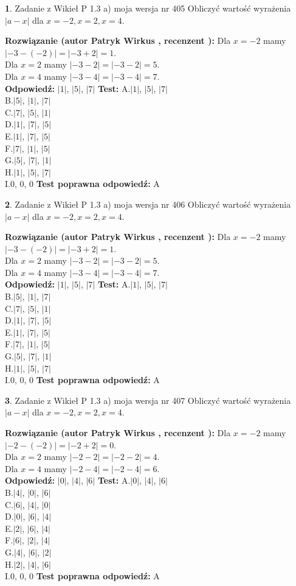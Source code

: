 \documentclass[12pt, a4paper]{article}
\theoremstyle{definition} %
\newtheorem{zad}{}
\newcommand{\zadStart}[1]{\begin{zad}#1\newline}
\newcommand{\zadStop}{\end{zad}}
\newcommand{\rozwStart}[2]{\noindent \textbf{Rozwiązanie (autor #1 , recenzent #2): }\newline}
\newcommand{\rozwStop}{\newline}
\newcommand{\odpStart}{\noindent \textbf{Odpowiedź:}\newline}
\newcommand{\odpStop}{\newline}
\newcommand{\testStart}{\noindent \textbf{Test:}\newline}
\newcommand{\testStop}{\newline}
\newcommand{\kluczStart}{\noindent \textbf{Test poprawna odpowiedź:}\newline}
\newcommand{\kluczStop}{\newline}
\begin{document}
\zadStart{Zadanie z Wikieł P 1.3 a) moja wersja nr 405}
Obliczyć wartość wyrażenia $|a - x|$ dla $x=-2,x=2,x=4$.
\zadStop
\rozwStart{Patryk Wirkus}{}
Dla $x = -2$ mamy $|-3 - (-2)| = |-3 + 2| = 1$.\\
Dla $x = 2$ mamy $|-3 - 2| = |-3 - 2| = 5$.\\
Dla $x = 4$ mamy $|-3 - 4| = |-3 - 4| = 7$.\\
\rozwStop
\odpStart
$|1|$, $|5|$, $|7|$
\odpStop
\testStart
A.$|1|$, $|5|$, $|7|$\\
B.$|5|$, $|1|$, $|7|$\\
C.$|7|$, $|5|$, $|1|$\\
D.$|1|$, $|7|$, $|5|$\\
E.$|1|$, $|7|$, $|5|$\\
F.$|7|$, $|1|$, $|5|$\\
G.$|5|$, $|7|$, $|1|$\\
H.$|1|$, $|5|$, $|7|$\\
I.$0$, $0$, $0$
\testStop
\kluczStart
A
\kluczStop



\zadStart{Zadanie z Wikieł P 1.3 a) moja wersja nr 406}
Obliczyć wartość wyrażenia $|a - x|$ dla $x=-2,x=2,x=4$.
\zadStop
\rozwStart{Patryk Wirkus}{}
Dla $x = -2$ mamy $|-3 - (-2)| = |-3 + 2| = 1$.\\
Dla $x = 2$ mamy $|-3 - 2| = |-3 - 2| = 5$.\\
Dla $x = 4$ mamy $|-3 - 4| = |-3 - 4| = 7$.\\
\rozwStop
\odpStart
$|1|$, $|5|$, $|7|$
\odpStop
\testStart
A.$|1|$, $|5|$, $|7|$\\
B.$|5|$, $|1|$, $|7|$\\
C.$|7|$, $|5|$, $|1|$\\
D.$|1|$, $|7|$, $|5|$\\
E.$|1|$, $|7|$, $|5|$\\
F.$|7|$, $|1|$, $|5|$\\
G.$|5|$, $|7|$, $|1|$\\
H.$|1|$, $|5|$, $|7|$\\
I.$0$, $0$, $0$
\testStop
\kluczStart
A
\kluczStop



\zadStart{Zadanie z Wikieł P 1.3 a) moja wersja nr 407}
Obliczyć wartość wyrażenia $|a - x|$ dla $x=-2,x=2,x=4$.
\zadStop
\rozwStart{Patryk Wirkus}{}
Dla $x = -2$ mamy $|-2 - (-2)| = |-2 + 2| = 0$.\\
Dla $x = 2$ mamy $|-2 - 2| = |-2 - 2| = 4$.\\
Dla $x = 4$ mamy $|-2 - 4| = |-2 - 4| = 6$.\\
\rozwStop
\odpStart
$|0|$, $|4|$, $|6|$
\odpStop
\testStart
A.$|0|$, $|4|$, $|6|$\\
B.$|4|$, $|0|$, $|6|$\\
C.$|6|$, $|4|$, $|0|$\\
D.$|0|$, $|6|$, $|4|$\\
E.$|2|$, $|6|$, $|4|$\\
F.$|6|$, $|2|$, $|4|$\\
G.$|4|$, $|6|$, $|2|$\\
H.$|2|$, $|4|$, $|6|$\\
I.$0$, $0$, $0$
\testStop
\kluczStart
A
\kluczStop
\end{document}
